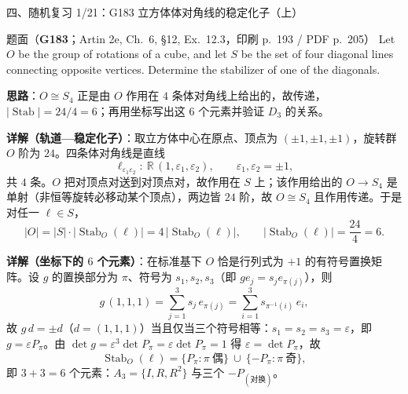\documentclass[aspectratio=169,10pt,fontset=none]{ctexbeamer}
\newcommand{\ex}[1]{\textcolor{accent}{\footnotesize\bfseries #1}}
\newcommand{\key}[1]{\textcolor{ink}{\bfseries #1}}
\begin{document}
\begin{frame}[t]{四、随机复习 1/21：G183 立方体体对角线的稳定化子（上）}
\label{ex:G183}
\scriptsize
\begin{block}{\footnotesize 题面（\ex{G183}；Artin 2e, Ch.~6, §12, Ex.~12.3，印刷 p.~193 / PDF p.~205）}
Let $O$ be the group of rotations of a cube, and let $S$ be the set of four diagonal lines connecting opposite vertices. Determine the stabilizer of one of the diagonals.
\end{block}
\key{思路}：$O\cong S_4$ 正是由 $O$ 作用在 $4$ 条体对角线上给出的，故传递，$|\operatorname{Stab}|=24/4=6$；再用坐标写出这 $6$ 个元素并验证 $D_3$ 的关系。

\key{详解（轨道—稳定化子）}：取立方体中心在原点、顶点为 $(\pm1,\pm1,\pm1)$，旋转群 $O$ 阶为 $24$。四条体对角线是直线
\[ \ell_{\varepsilon_1\varepsilon_2}:\ \mathbb R\,(1,\varepsilon_1,\varepsilon_2),\qquad \varepsilon_1,\varepsilon_2=\pm1, \]
共 $4$ 条。$O$ 把对顶点对送到对顶点对，故作用在 $S$ 上；该作用给出的 $O\to S_4$ 是单射（非恒等旋转必移动某个顶点），两边皆 $24$ 阶，故 $O\cong S_4$ 且作用传递。于是对任一 $\ell\in S$，
\[ |O|=|S|\cdot|\operatorname{Stab}_O(\ell)|=4\,|\operatorname{Stab}_O(\ell)|,\qquad |\operatorname{Stab}_O(\ell)|=\frac{24}{4}=6. \]

\key{详解（坐标下的 $6$ 个元素）}：在标准基下 $O$ 恰是行列式为 $+1$ 的有符号置换矩阵。设 $g$ 的置换部分为 $\pi$、符号为 $s_1,s_2,s_3$（即 $ge_j=s_j e_{\pi(j)}$），则
\[ g\,(1,1,1)=\sum_{j=1}^{3}s_j\,e_{\pi(j)}=\sum_{i=1}^{3}s_{\pi^{-1}(i)}\,e_i, \]
故 $g\,d=\pm d$（$d=(1,1,1)$）当且仅当三个符号相等：$s_1=s_2=s_3=\varepsilon$，即 $g=\varepsilon P_\pi$。由 $\det g=\varepsilon^3\det P_\pi=\varepsilon\det P_\pi=1$ 得 $\varepsilon=\det P_\pi$，故
\[ \operatorname{Stab}_O(\ell)=\{P_\pi:\pi\ \text{偶}\}\ \cup\ \{-P_\pi:\pi\ \text{奇}\}, \]
即 $3+3=6$ 个元素：$A_3=\{I,R,R^2\}$ 与三个 $-P_{(\text{对换})}$。
\end{frame}
\end{document}
